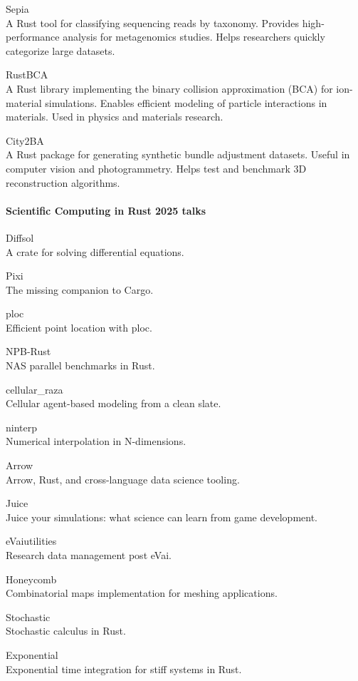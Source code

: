 \documentclass{article}
\begin{document}
Sepia\\
A Rust tool for classifying sequencing reads by taxonomy. Provides high-performance
analysis for metagenomics studies. Helps researchers quickly categorize large datasets.

RustBCA\\
A Rust library implementing the binary collision approximation (BCA) for ion-material
simulations. Enables efficient modeling of particle interactions in materials. Used in physics and
materials research.

City2BA\\
A Rust package for generating synthetic bundle adjustment datasets. Useful in computer
vision and photogrammetry. Helps test and benchmark 3D reconstruction algorithms.

\paragraph{Scientific Computing in Rust 2025 talks}

Diffsol\\
A crate for solving differential equations.

Pixi\\
The missing companion to Cargo.

ploc\\
Efficient point location with ploc.

NPB-Rust\\
NAS parallel benchmarks in Rust.

cellular\_raza\\
Cellular agent-based modeling from a clean slate.

ninterp\\
Numerical interpolation in N-dimensions.

Arrow\\
Arrow, Rust, and cross-language data science tooling.

Juice\\
Juice your simulations: what science can learn from game development.

eVaiutilities\\
Research data management post eVai.

Honeycomb\\
Combinatorial maps implementation for meshing applications.

Stochastic\\
Stochastic calculus in Rust.

Exponential\\
Exponential time integration for stiff systems in Rust.
\end{document}
